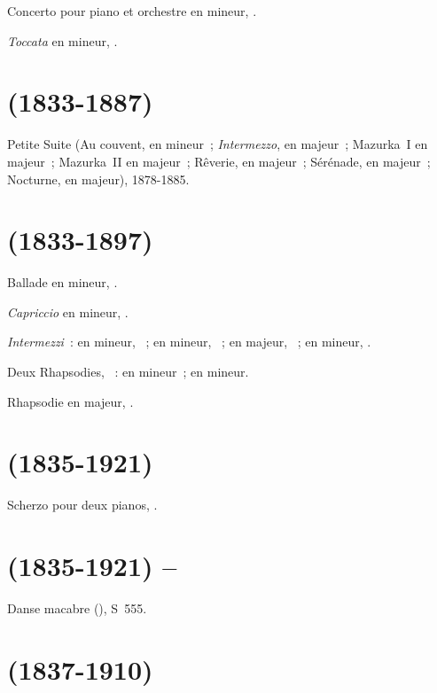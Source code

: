 Concerto pour piano et orchestre  en \kD mineur, .

\emph{Toccata} en \kD mineur,  .

\section[%
Aleksandr Borodin (1833-1887)]{%
\ABorodine{} (1833-1887)}

Petite Suite (Au couvent, en \kC \Sharp mineur~; \emph{Intermezzo}, en \kF
majeur~; Mazurka~I en \kC majeur~; Mazurka~II en \kD \Flat majeur~; Rêverie,
en \kD \Flat majeur~; Sérénade, en \kD \Flat majeur~; Nocturne, en \kG \Flat
majeur), 1878-1885.

\section[%
Johannes Brahms (1833-1897)]{%
\JBrahms{} (1833-1897)}

Ballade en \kG mineur,  .

\emph{Capriccio} en \kB mineur,  .

\emph{Intermezzi}~: en \kC \Sharp mineur,  ~; en \kA
mineur,  ~; en \kA majeur,  ~; en
\kE \Flat mineur,  .

Deux Rhapsodies, ~:  en \kB mineur~;  en \kG
mineur.

Rhapsodie en \kE \Flat majeur,  .

\section[%
Camille Saint-Saëns (1835-1921)]{%
\CSaintSaens{} (1835-1921)}

Scherzo pour deux pianos, .

\section[%
Camille Saint-Saëns (1835-1921) -- Ferenc Liszt]{%
\CSaintSaens{} (1835-1921) -- \FLiszt{}}

Danse macabre (), S~555.

\section[%
Milij Balakirev (1837-1910)]{%
\MBalakirev{} (1837-1910)}

